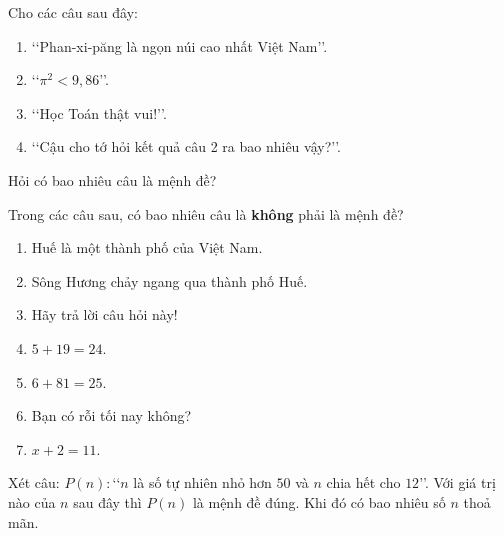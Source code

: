 \begin{bt}%
	Cho các câu  sau đây:
	\begin{enumerate}
		\item \lq\lq Phan-xi-păng là ngọn  núi cao nhất Việt Nam\rq\rq.
		\item  \lq\lq $\pi ^2< 9,86$\rq\rq.
		\item \lq\lq Học Toán  thật vui!\rq\rq.
		\item \lq\lq Cậu cho  tớ hỏi kết quả câu 2 ra bao nhiêu vậy?\rq\rq.
	\end{enumerate}
	Hỏi có bao  nhiêu câu là mệnh đề?
\end{bt}

\begin{bt}%
	Trong các câu sau, có bao  nhiêu câu là \textbf{không} phải là mệnh đề?
	\begin{enumerate}
		 \item Huế là một thành phố của Việt Nam.
		\item Sông Hương chảy ngang qua thành phố  Huế.
		 \item Hãy trả lời câu hỏi này!
		 \item $5+19=24$.
		\item $6+81=25$. 
		\item Bạn có rỗi tối nay  không?
		\item  $x+2=11$.
	\end{enumerate}
\end{bt}

\begin{bt}%
	Xét câu: $P(n)\colon$\lq\lq$n$ là số tự nhiên nhỏ hơn $50$ và $n$ chia hết cho  $12$\rq\rq. Với giá trị nào của $n$ sau đây thì $P(n)$ là mệnh đề đúng. Khi đó có bao nhiêu số $n$ thoả mãn.
\end{bt}

